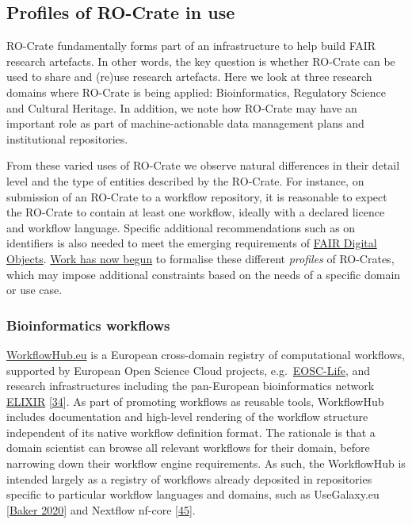 \hypertarget{inuse}{%
\subsection{Profiles of RO-Crate in use}\label{inuse}}

RO-Crate fundamentally forms part of an infrastructure to help build
FAIR research artefacts. In other words, the key question is whether
RO-Crate can be used to share and (re)use research artefacts. Here we
look at three research domains where RO-Crate is being applied:
Bioinformatics, Regulatory Science and Cultural Heritage. In addition,
we note how RO-Crate may have an important role as part of
machine-actionable data management plans and institutional repositories.

From these varied uses of RO-Crate we observe natural differences in
their detail level and the type of entities described by the RO-Crate.
For instance, on submission of an RO-Crate to a workflow repository, it
is reasonable to expect the RO-Crate to contain at least one workflow,
ideally with a declared licence and workflow language. Specific
additional recommendations such as on identifiers is also needed to meet
the emerging requirements of \href{https://fairdo.org/}{FAIR Digital
Objects}.
\href{https://github.com/ResearchObject/ro-crate/issues/153}{Work has
now begun} to formalise these different \emph{profiles} of RO-Crates,
which may impose additional constraints based on the needs of a specific
domain or use case.

\hypertarget{workflows}{%
\subsubsection{Bioinformatics workflows}\label{workflows}}

\href{https://workflowhub.eu/}{WorkflowHub.eu} is a European
cross-domain registry of computational workflows, supported by European
Open Science Cloud projects,
e.g.~\href{https://www.eosc-life.eu/}{EOSC-Life}, and research
infrastructures including the pan-European bioinformatics network
\href{https://elixir-europe.org/}{ELIXIR}
{[}\href{https://doi.org/10.1016/j.tibtech.2012.02.002}{34}{]}. As part
of promoting workflows as reusable tools, WorkflowHub includes
documentation and high-level rendering of the workflow structure
independent of its native workflow definition format. The rationale is
that a domain scientist can browse all relevant workflows for their
domain, before narrowing down their workflow engine requirements. As
such, the WorkflowHub is intended largely as a registry of workflows
already deposited in repositories specific to particular workflow
languages and domains, such as UseGalaxy.eu
{[}\href{https://doi.org/10.1371/journal.ppat.1008643}{Baker 2020}{]} and
Nextflow nf-core
{[}\href{https://doi.org/10.1038/s41587-020-0439-x}{45}{]}.

